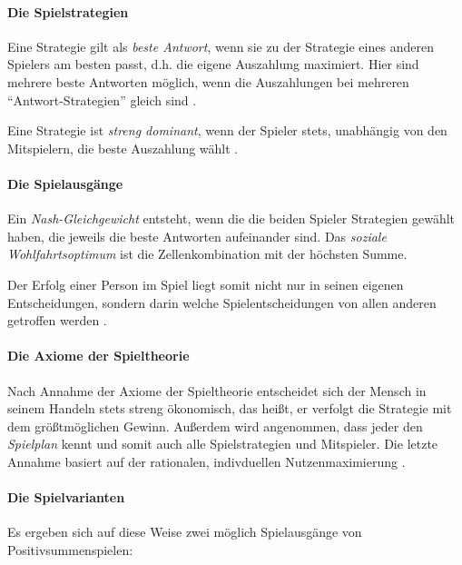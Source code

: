 \paragraph{Die Spielstrategien}

Eine Strategie gilt als \emph{beste Antwort}, wenn sie zu der Strategie eines anderen Spielers am besten passt, d.h. die eigene Auszahlung maximiert.
Hier sind mehrere beste Antworten möglich, wenn die Auszahlungen bei mehreren ``Antwort-Strategien'' gleich sind \parencite[vgl.][153]{Kleinberg-2009-oz}.

Eine Strategie ist \emph{streng dominant}, wenn der Spieler stets, unabhängig von den Mitspielern, die beste Auszahlung wählt \parencite[vgl.][164]{Kleinberg-2009-oz}.


\paragraph{Die Spielausgänge}

Ein \emph{Nash-Gleichgewicht } entsteht, wenn die die beiden Spieler Strategien gewählt haben, die jeweils die beste Antworten aufeinander sind.
Das \emph{soziale Wohlfahrtsoptimum} ist die Zellenkombination mit der höchsten Summe.

Der Erfolg einer Person im Spiel liegt somit nicht nur in seinen eigenen Entscheidungen, sondern darin welche Spielentscheidungen von allen anderen getroffen werden \parencite[vgl.][156]{Kleinberg-2009-oz}.


\paragraph{Die Axiome der Spieltheorie}

Nach Annahme der Axiome der Spieltheorie entscheidet sich der Mensch in seinem Handeln stets streng ökonomisch, das heißt, er verfolgt die Strategie mit dem größtmöglichen Gewinn.
Außerdem wird angenommen, dass jeder den \emph{Spielplan} kennt und somit auch alle Spielstrategien und Mitspieler.
Die letzte Annahme basiert auf der rationalen, indivduellen Nutzenmaximierung \parencite[vgl.][159]{Kleinberg-2009-oz}.


\paragraph{Die Spielvarianten}

Es ergeben sich auf diese Weise zwei möglich Spielausgänge von Positivsummenspielen:

